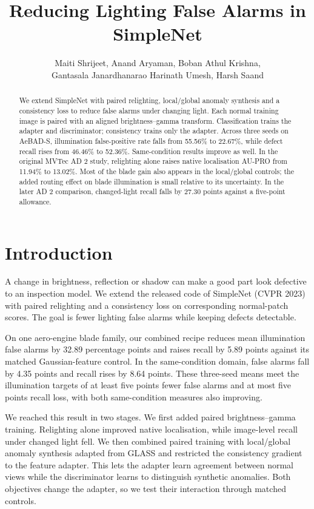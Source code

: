 \documentclass[letterpaper]{article}
\title{Reducing Lighting False Alarms in SimpleNet}
\author{Maiti Shrijeet, Anand Aryaman, Boban Athul Krishna,\\
Gantasala Janardhanarao Harinath Umesh, Harsh Saand}
\begin{document}
\maketitle

\begin{abstract}
We extend SimpleNet with paired relighting, local/global anomaly synthesis and a consistency
loss to reduce false alarms under changing light. Each normal training image is paired with
an aligned brightness--gamma transform. Classification trains the adapter and discriminator;
consistency trains only the adapter.
Across three seeds on AeBAD-S, illumination false-positive rate falls from 55.56\% to
22.67\%, while defect recall rises from 46.46\% to 52.36\%. Same-condition results improve
as well. In the original MVTec AD 2 study, relighting alone raises native localisation
AU-PRO from 11.94\% to 13.02\%. Most of the blade gain also appears in the local/global
controls; the added routing effect on blade illumination is small relative to its
uncertainty. In the later AD 2 comparison, changed-light recall falls by 27.30 points
against a five-point allowance.
\end{abstract}

\section{Introduction}

A change in brightness, reflection or shadow can make a good part look defective to an
inspection model. We extend the released code of SimpleNet (CVPR 2023)
\citep{liu2023simplenet} with paired relighting and a consistency loss on corresponding
normal-patch scores. The goal is fewer lighting false alarms while keeping defects
detectable.

On one aero-engine blade family, our combined recipe reduces mean illumination false alarms
by 32.89 percentage points and raises recall by 5.89 points against its matched
Gaussian-feature control. In the same-condition domain, false alarms fall by 4.35 points and
recall rises by 8.64 points. These three-seed means meet the illumination targets of at
least five points fewer false alarms and at most five points recall loss, with both
same-condition measures also improving.

We reached this result in two stages. We first added paired brightness--gamma training.
Relighting alone improved native localisation, while image-level recall under changed light
fell. We then combined paired training with local/global anomaly synthesis adapted from
GLASS \citep{chen2024glass} and restricted the consistency gradient to the feature adapter.
This lets the adapter learn agreement between normal views while the discriminator learns to
distinguish synthetic anomalies. Both objectives change the adapter, so we test their
interaction through matched controls.
\end{document}
